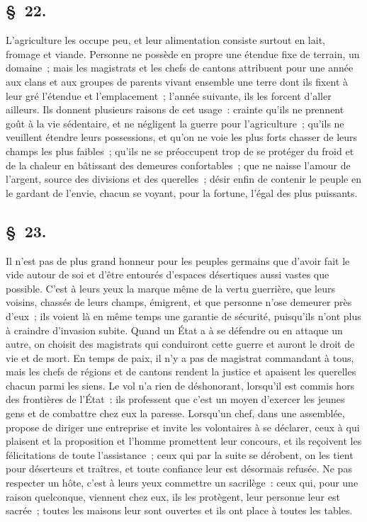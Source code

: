 \documentclass[french,twoside]{book} %
\begin{document}
\subsection[{§ 22.}]{ \textsc{§ 22.} }
\noindent L'agriculture les occupe peu, et leur alimentation consiste surtout en lait, fromage et viande. Personne ne possède en propre une étendue fixe de terrain, un domaine ; mais les magistrats et les chefs de cantons attribuent pour une année aux clans et aux groupes de parents vivant ensemble une terre dont ils fixent à leur gré l’étendue et l’emplacement ; l’année suivante, ils les forcent d’aller ailleurs. Ils donnent plusieurs raisons de cet usage : crainte qu’ils ne prennent goût à la vie sédentaire, et ne négligent la guerre pour l’agriculture ; qu’ils ne veuillent étendre leurs possessions, et qu’on ne voie les plus forts chasser de leurs champs les plus faibles ; qu’ils ne se préoccupent trop de se protéger du froid et de la chaleur en bâtissant des demeures confortables ; que ne naisse l’amour de l’argent, source des divisions et des querelles ; désir enfin de contenir le peuple en le gardant de l’envie, chacun se voyant, pour la fortune, l’égal des plus puissants.
\subsection[{§ 23.}]{ \textsc{§ 23.} }
\noindent Il n’est pas de plus grand honneur pour les peuples germains que d’avoir fait le vide autour de soi et d’être entourés d’espaces désertiques aussi vastes que possible. C'est à leurs yeux la marque même de la vertu guerrière, que leurs voisins, chassés de leurs champs, émigrent, et que personne n’ose demeurer près d’eux ; ils voient là en même temps une garantie de sécurité, puisqu’ils n’ont plus à craindre d’invasion subite. Quand un État a à se défendre ou en attaque un autre, on choisit des magistrats qui conduiront cette guerre et auront le droit de vie et de mort. En temps de paix, il n’y a pas de magistrat commandant à tous, mais les chefs de régions et de cantons rendent la justice et apaisent les querelles chacun parmi les siens. Le vol n’a rien de déshonorant, lorsqu’il est commis hors des frontières de l’État : ils professent que c’est un moyen d’exercer les jeunes gens et de combattre chez eux la paresse. Lorsqu’un chef, dans une assemblée, propose de diriger une entreprise et invite les volontaires à se déclarer, ceux à qui plaisent et la proposition et l’homme promettent leur concours, et ils reçoivent les félicitations de toute l’assistance ; ceux qui par la suite se dérobent, on les tient pour déserteurs et traîtres, et toute confiance leur est désormais refusée. Ne pas respecter un hôte, c’est à leurs yeux commettre un sacrilège : ceux qui, pour une raison quelconque, viennent chez eux, ils les protègent, leur personne leur est sacrée ; toutes les maisons leur sont ouvertes et ils ont place à toutes les tables.
\end{document}

